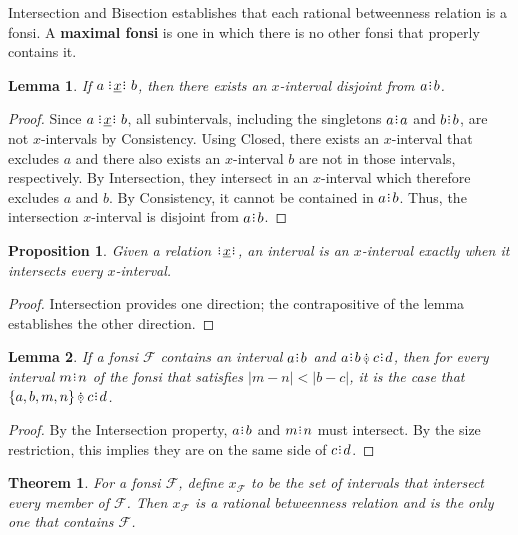 \documentclass[12pt]{article}
\newtheorem{lemma}{Lemma}[section]
\newtheorem{proposition}{Proposition}[section]
\newtheorem{theorem}{Theorem}
\begin{document}
Intersection and Bisection establishes that each rational betweenness relation is a fonsi. A \textbf{maximal fonsi} is one in which there is no other fonsi that properly contains it. 

\begin{lemma}\label{br-lem-witness}
    If \sout{$a \xrel b$}, then there exists an $x$-interval disjoint from $a \rint b$.
\end{lemma}

\begin{proof}
    Since \sout{$a \xrel b$}, all subintervals, including the singletons $a\rint a$ and $b\rint b$, are not $x$-intervals by Consistency. Using Closed, there exists an $x$-interval that excludes  $a$ and there also exists an $x$-interval $b$ are not in those intervals, respectively. By Intersection, they intersect in an $x$-interval which therefore excludes $a$ and $b$. By Consistency, it cannot be contained in $a \rint b$. Thus, the intersection $x$-interval is disjoint from $a \rint b$.
\end{proof}

\begin{proposition}\label{br--something-outside} 
    Given a relation $\xrel$, an interval is an $x$-interval exactly when it intersects every $x$-interval. 
\end{proposition}

\begin{proof}
    Intersection provides one direction; the contrapositive of the lemma establishes the other direction. 
\end{proof}


\begin{lemma}\label{br-lem-same-side}
    If a fonsi $\mathcal{F}$ contains an interval $a \rint b$ and $a \rint b \betneq c \rint d$, then for every interval $m  \rint n$ of the fonsi that satisfies $|m-n| < |b-c|$, it is the case that $\{a, b, m, n\} \betneq c \rint d$.
\end{lemma}

\begin{proof}
 By the Intersection property, $a \rint b$ and $m \rint n$ must intersect. By the size restriction, this implies they are on the same side of $c \rint d$. 
\end{proof}


\begin{theorem}
    For a fonsi $\mathcal{F}$, define $x_{\mathcal{F}}$ to be the set of intervals that intersect every member of $\mathcal{F}$. Then $x_{\mathcal{F}}$ is a rational betweenness relation and is the only one that contains $\mathcal{F}$.
\end{theorem}
\end{document}
